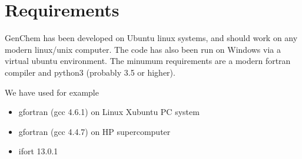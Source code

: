 \documentclass[a4paper,10pt,english]{sphinxmanual}
\begin{document}
\begin{sphinxVerbatim}[commandchars=\\\{\}]
                    
                          

     

   

         
                      
\end{sphinxVerbatim}


\section{Requirements}
\label{\detokenize{GenChemDoc_intro:requirements}}
GenChem has been developed on Ubuntu linux systems, and
should work on any modern linux/unix computer. The code has also been
run on Windows via a virtual ubuntu environment.
The minumum requirements are a modern fortran compiler and python3
(probably 3.5 or higher).

We have used for example
\begin{itemize}
\item {} 
gfortran (gcc 4.6.1) on Linux Xubuntu PC system

\item {} 
gfortran (gcc 4.4.7) on HP supercomputer

\item {} 
ifort 13.0.1

\end{itemize}
\end{document}
